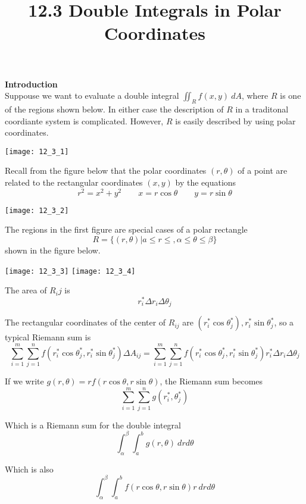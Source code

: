 \documentclass{article}
\title{12.3 Double Integrals in Polar Coordinates}
\begin{document}
  \maketitle
  \textbf{Introduction}\\
  Suppouse we want to evaluate a double integral $ \iint_R f(x,y)~dA $, where $ R $ is one of the regions shown below. In either case the description of $ R $ in a traditonal coordiante system is complicated. However, $ R $ is easily described by using polar coordinates.

  \begin{center}
    \texttt{[image: 12\_3\_1]}
  \end{center}

  Recall from the figure below that the polar coordinates $ (r,\theta) $ of a point are related to the rectangular coordinates $ (x,y) $ by the equations
  \[
    \boxed{r^{2}=x^{2}+y^{2} \qquad x=r\cos{\theta} \qquad y=r\sin{\theta}}
  \]

  \begin{center}
    \texttt{[image: 12\_3\_2]}
  \end{center}
 
  The regions in the first figure are special cases of a polar rectangle
  \[
    R=\{ (r,\theta) | a \le r \le, \alpha \le \theta \le \beta \}
  \]
  shown in the figure below.

  \begin{center}
    \texttt{[image: 12\_3\_3]}
    \texttt{[image: 12\_3\_4]}
  \end{center}

  The area of $ R_ij $ is
  \[
    r^{*}_i \Delta r_i \Delta \theta_j
  \]
  

  The rectangular coordinates of the center of $ R_{ij} $ are $ (r^{*}_i\cos{\theta}^{*}_j), r^{*}_i\sin{\theta}^{*}_j $, so a typical Riemann sum is
  \[
   \sum^{m}_{i=1} \sum^{n}_{j=1} f(r^{*}_i \cos{\theta}^{*}_j,r^{*}_i \sin{\theta}^{*}_j) \Delta A_{ij} = \sum^{m}_{i=1} \sum^{n}_{j=1} f(r^{*}_i \cos{\theta}^{*}_j,r^{*}_i \sin{\theta}^{*}_j) r^{*}_i \Delta r_i \Delta \theta_j
  \]

  If we write $ g(r,\theta)= r f(r\cos{\theta},r\sin{\theta}) $, the Riemann sum becomes
  \[
    \sum^{m}_{i=1}\sum^{n}_{j=1} g(r^{*}_i, \theta^{*}_j)   
  \]

  Which is a Riemann sum for the double integral
  \[
    \int^{\beta}_{\alpha} \int^{b}_{a} g(r,\theta) ~ dr d\theta
  \]

  Which is also
  \[
    \int^{\beta}_{\alpha} \int^{b}_{a} f(r\cos{\theta},r\sin{\theta})r ~drd\theta 
  \]
\end{document}

